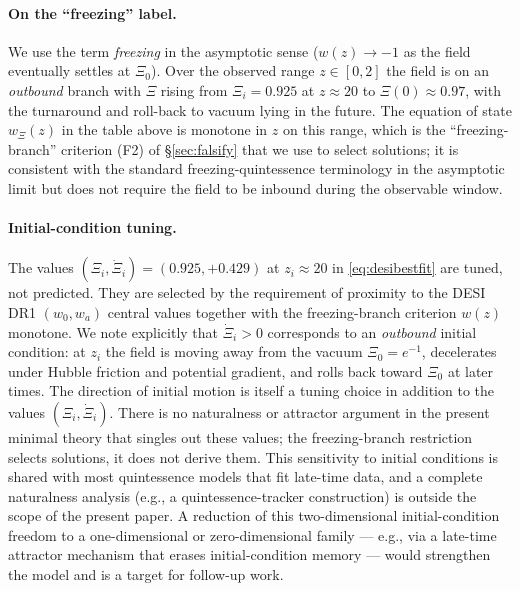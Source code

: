 \documentclass[11pt,reqno]{amsart}
\theoremstyle{plain}
\theoremstyle{definition}
\theoremstyle{remark}
\begin{document}
\paragraph{On the ``freezing'' label.}
We use the term \emph{freezing} in the asymptotic sense
($w(z)\to -1$ as the field eventually settles at $\Xi_0$). Over
the observed range $z\in[0, 2]$ the field is on an \emph{outbound}
branch with $\Xi$ rising from $\Xi_i = 0.925$ at $z\approx 20$ to
$\Xi(0)\approx 0.97$, with the turnaround and roll-back to vacuum
lying in the future. The equation of state $w_\Xi(z)$ in the
table above is monotone in $z$ on this range, which is the
``freezing-branch'' criterion (F2) of \S\ref{sec:falsify} that we
use to select solutions; it is consistent with the standard
freezing-quintessence terminology in the asymptotic limit but
does not require the field to be inbound during the
observable window.

\paragraph{Initial-condition tuning.}
The values $(\Xi_i, \dot\Xi_i) = (0.925, +0.429)$ at $z_i \approx 20$ in
\eqref{eq:desibestfit} are tuned, not predicted. They are selected by
the requirement of proximity to the DESI DR1 $(w_0, w_a)$ central values
together with the freezing-branch criterion $w(z)$ monotone. We note
explicitly that $\dot\Xi_i > 0$ corresponds to an \emph{outbound}
initial condition: at $z_i$ the field is moving away from the
vacuum $\Xi_0 = e^{-1}$, decelerates under Hubble friction and
potential gradient, and rolls back toward $\Xi_0$ at later times. The
direction of initial motion is itself a tuning choice in addition to
the values $(\Xi_i, \dot\Xi_i)$. There is
no naturalness or attractor argument in the present minimal theory
that singles out these values; the freezing-branch restriction selects
solutions, it does not derive them. This sensitivity to initial
conditions is shared with most quintessence models that fit
late-time data, and a complete naturalness analysis (e.g., a
quintessence-tracker construction) is outside the scope of the present
paper. A reduction of this two-dimensional initial-condition freedom
to a one-dimensional or zero-dimensional family --- e.g., via a
late-time attractor mechanism that erases initial-condition memory ---
would strengthen the model and is a target for follow-up work.
\end{document}
